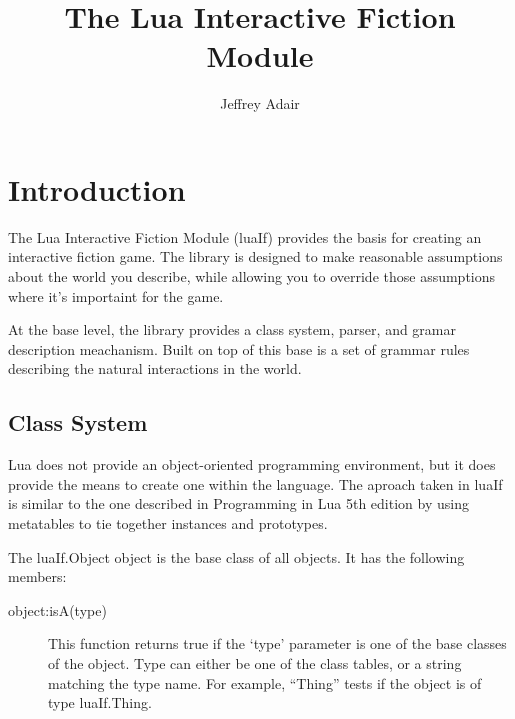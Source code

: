\documentclass{book}
\title{The Lua Interactive Fiction Module}
\author{Jeffrey Adair}
\begin{document}
\maketitle

\chapter{Introduction}

The Lua Interactive Fiction Module (luaIf) provides the basis for
creating an interactive fiction game. The library is designed to make
reasonable assumptions about the world you describe, while allowing
you to override those assumptions where it's importaint for the game.

At the base level, the library provides a class system, parser, and
gramar description meachanism. Built on top of this base is a set of
grammar rules describing the natural interactions in the world.

\section{Class System}

Lua does not provide an object-oriented programming environment, but
it does provide the means to create one within the language. The
aproach taken in luaIf is similar to the one described in Programming
in Lua 5th edition by using metatables to tie together instances and
prototypes.

The luaIf.Object object is the base class of all objects. It has the
following members:

\begin{description}
\item[object:isA(type)] This function returns true if the `type'
  parameter is one of the base classes of the object. Type can either
  be one of the class tables, or a string matching the type name. For
  example, ``Thing'' tests if the object is of type luaIf.Thing.

\end{description}
\end{document}
